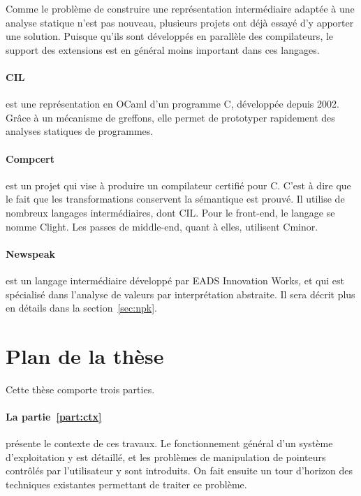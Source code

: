 Comme le problème de construire une représentation intermédiaire adaptée à une
analyse statique n'est pas nouveau, plusieurs projets ont déjà essayé d'y
apporter une solution. Puisque qu'ils sont développés en parallèle des
compilateurs, le support des extensions est en général moins important dans ces
langages.

\paragraph{CIL}\cite{NeculaCil}  est une représentation en
OCaml d'un programme C, développée depuis 2002. Grâce à un mécanisme de
greffons, elle permet de prototyper rapidement des analyses statiques de
programmes.

\paragraph{Compcert} est un projet qui vise à produire un compilateur certifié
pour C. C'est à dire que le fait que les transformations conservent la
sémantique est prouvé. Il utilise de nombreux langages intermédiaires, dont CIL.
Pour le front-end, le langage se nomme Clight\cite{cfront}. Les passes de
middle-end, quant à elles, utilisent Cminor\cite{cminorSL}.

\paragraph{Newspeak}\cite{newspeak} est un langage intermédiaire développé par
EADS Innovation Works, et qui est spécialisé dans l'analyse de valeurs par
interprétation abstraite. Il sera décrit plus en détails dans la
section~\ref{sec:npk}.


\section{Plan de la thèse}

Cette thèse comporte trois parties.

\paragraph{La partie~\ref{part:ctx}} présente le contexte de ces travaux. Le
fonctionnement général d'un système d'exploitation y est détaillé, et les
problèmes de manipulation de pointeurs contrôlés par l'utilisateur y sont
introduits. On fait ensuite un tour d'horizon des techniques existantes
permettant de traiter ce problème.

